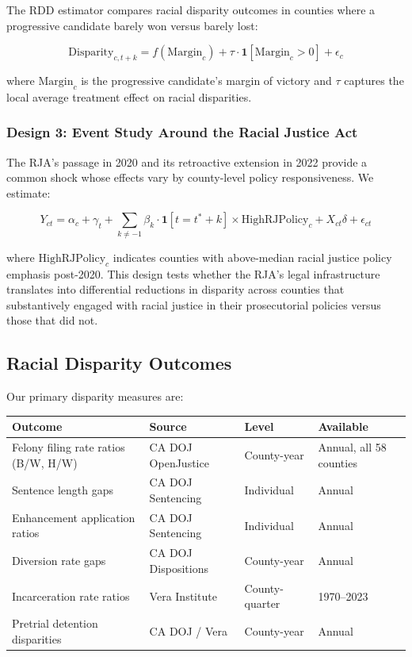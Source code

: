 \documentclass[12pt]{article}
\begin{document}
The RDD estimator compares racial disparity outcomes in counties where a progressive candidate barely won versus barely lost:

\begin{equation}
\text{Disparity}_{c,t+k} = f(\text{Margin}_c) + \tau \cdot \mathbf{1}[\text{Margin}_c > 0] + \epsilon_c
\end{equation}

\noindent where $\text{Margin}_c$ is the progressive candidate's margin of victory and $\tau$ captures the local average treatment effect on racial disparities.

\subsubsection*{Design 3: Event Study Around the Racial Justice Act}

The RJA's passage in 2020 and its retroactive extension in 2022 provide a common shock whose effects vary by county-level policy responsiveness. We estimate:

\begin{equation}
Y_{ct} = \alpha_c + \gamma_t + \sum_{k \neq -1} \beta_k \cdot \mathbf{1}[t = t^* + k] \times \text{HighRJPolicy}_c + X_{ct}\delta + \epsilon_{ct}
\end{equation}

\noindent where $\text{HighRJPolicy}_c$ indicates counties with above-median racial justice policy emphasis post-2020. This design tests whether the RJA's legal infrastructure translates into differential reductions in disparity across counties that substantively engaged with racial justice in their prosecutorial policies versus those that did not.

\subsection{Racial Disparity Outcomes}

Our primary disparity measures are:

\begin{table}[h]
\centering
\small
\begin{tabular}{llll}
\toprule
\textbf{Outcome} & \textbf{Source} & \textbf{Level} & \textbf{Available} \\
\midrule
Felony filing rate ratios (B/W, H/W) & CA DOJ OpenJustice & County-year & Annual, all 58 counties \\
Sentence length gaps & CA DOJ Sentencing & Individual & Annual \\
Enhancement application ratios & CA DOJ Sentencing & Individual & Annual \\
Diversion rate gaps & CA DOJ Dispositions & County-year & Annual \\
Incarceration rate ratios & Vera Institute & County-quarter & 1970--2023 \\
Pretrial detention disparities & CA DOJ / Vera & County-year & Annual \\
\bottomrule
\end{tabular}
\end{table}
\end{document}
